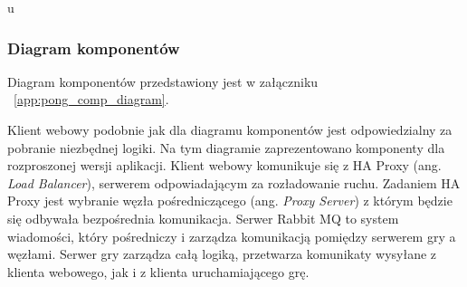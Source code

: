 u\subsubsection{Diagram komponentów}

Diagram komponentów przedstawiony jest w załączniku ~\ref{app:pong_comp_diagram}.

\par

Klient webowy podobnie jak dla diagramu komponentów jest odpowiedzialny za pobranie niezbędnej logiki. Na tym diagramie zaprezentowano komponenty dla rozproszonej wersji aplikacji. Klient webowy komunikuje się z HA Proxy (ang. \emph{Load Balancer}), serwerem odpowiadającym za rozładowanie ruchu. Zadaniem HA Proxy jest wybranie węzła pośredniczącego (ang. \emph{Proxy Server}) z którym będzie się odbywała bezpośrednia komunikacja. Serwer Rabbit MQ to system wiadomości, który pośredniczy i zarządza komunikacją pomiędzy serwerem gry a węzłami. Serwer gry zarządza całą logiką, przetwarza komunikaty wysyłane z klienta webowego, jak i z klienta uruchamiającego grę. 
